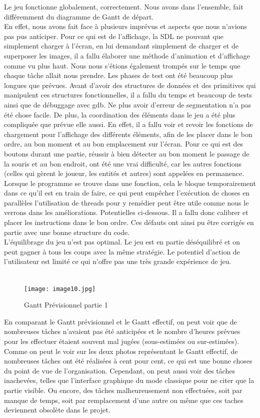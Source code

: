 \documentclass[a4paper,11pt]{article}
\begin{document}
Le jeu fonctionne globalement, correctement. Nous avons dans l'ensemble, fait différemment du diagramme de Gantt de départ.\\ En effet, nous avons fait face à plusieurs imprévus et aspects que nous n'avions pas pus anticiper. Pour ce qui est de l'affichage, la SDL ne pouvant que simplement charger à l'écran, en lui demandant simplement de charger et de superposer les images, il a fallu élaborer une méthode d'animation et d'affichage comme vu plus haut. Nous nous s'étions également trompés sur le temps que chaque tâche allait nous prendre. Les phases de test ont été beaucoup plus longues que prévues. Avant d'avoir des structures de données et des primitives qui manipulent ces structures fonctionnelles, il a fallu du temps et beaucoup de tests ainsi que de débuggage avec gdb. Ne plus avoir d'erreur de segmentation n'a pas été chose facile.
De plus, la coordination des éléments dans le jeu a été plus compliquée que prévue elle aussi. En effet, il a fallu voir et revoir les fonctions de chargement pour l'affichage des différents éléments, afin de les placer dans le bon ordre, au bon moment et au bon emplacement sur l'écran. Pour ce qui est des boutons durant une partie, réussir à bien détecter au bon moment le passage de la souris et au bon endroit, ont été une vrai difficulté, car les autres fonctions (celles qui gèrent le joueur, les entités et autres) sont appelées en permanence. Lorsque le programme se trouve dans une fonction, cela le bloque temporairement dans ce qu'il est en train de faire, ce qui peut empêcher l'exécution de choses en parallèles l'utilisation de threads pour y remédier peut être utile comme nous le verrons dans les améliorations.
Potentielles ci-dessous. Il a fallu donc calibrer et placer les instructions dans le bon ordre. Ces défauts ont ainsi pu être corrigés en partie avec une bonne structure du code. \\ L'équilibrage du jeu n'est pas optimal. Le jeu est en partie déséquilibré et on peut gagner à tous les coups avec la même stratégie. Le potentiel d'action de l'utilisateur est limité ce qui n'offre pas une très grande expérience de jeu.\\\\ 


\begin{figure}[ht!]
\centering
\texttt{[image: image10.jpg]} 
\caption {\label{image10} Gantt Prévisionnel partie 1}
\end{figure}
 \smallbreak

En comparant le Gantt prévisionnel et le Gantt effectif, on peut voir que de nombreuses tâches n'avaient pas été anticipées et le nombre d'heures prévues pour les effectuer étaient souvent mal jugées (sous-estimées ou sur-estimées). Comme on peut le voir sur les deux photos  représentant le Gantt effectif, de nombreuses tâches ont été réalisées à cent pour cent, ce qui est une bonne choses du point de vue de l'organisation. Cependant, on peut aussi voir des tâches inachevées, telles que l'interface graphique du mode classique pour ne citer que la partie visible. Ou encore, des tâches malheureusement non effectuées, soit par manque de temps, soit par remplacement d'une autre ou même que ces taches deviennent obsolète dans le projet.
\end{document}
